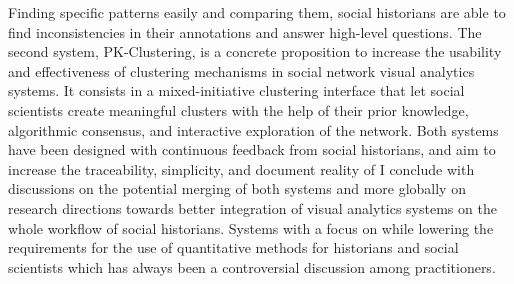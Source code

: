 {    Finding specific patterns easily and comparing them, social historians are able to find inconsistencies in their annotations and answer high-level questions.
    The second system, PK-Clustering, is a concrete proposition to increase the usability and effectiveness of clustering mechanisms in social network visual analytics systems. It consists in a mixed-initiative clustering interface that let social scientists create meaningful clusters with the help of their prior knowledge, algorithmic consensus, and interactive exploration of the network.
    Both systems have been designed with continuous feedback from social historians, and aim to increase the traceability, simplicity, and document reality of
    I conclude with discussions on the potential merging of both systems and more globally on research directions towards better integration of visual analytics systems on the whole workflow of social historians.
    Systems with a focus on  while lowering the requirements for the use of quantitative methods for historians and social scientists which has always been a controversial discussion among practitioners.}

